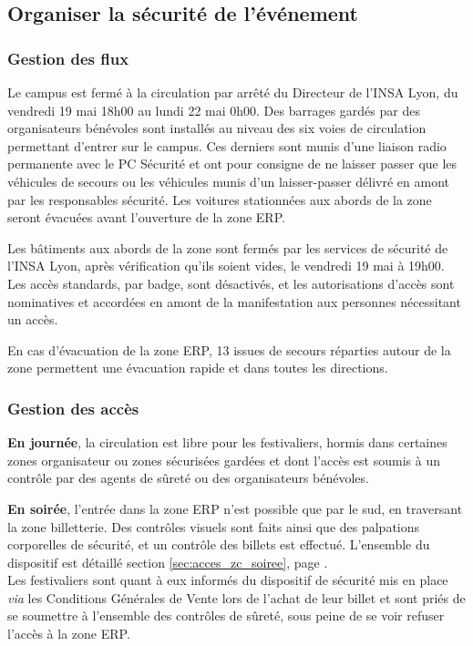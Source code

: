 \documentclass[hidelinks, paper=a4, fontsize=13pt]{report}
\begin{document}
\subsection{Organiser la sécurité de l'événement}

\subsubsection{Gestion des flux}
\label{gestion_flux}

\begin{list}{•}{}
	\item Le campus est fermé à la circulation par arrêté du Directeur de l'INSA Lyon, du vendredi 19 mai 18h00 au lundi 22 mai 0h00. Des barrages gardés par des organisateurs bénévoles sont installés au niveau des six voies de circulation permettant d'entrer sur le campus. Ces derniers sont munis d'une liaison radio permanente avec le PC Sécurité et ont pour consigne de ne laisser passer que les véhicules de secours ou les véhicules munis d'un laisser-passer délivré en amont par les responsables sécurité. Les voitures stationnées aux abords de la zone seront évacuées avant l'ouverture de la zone ERP.
	\item Les bâtiments aux abords de la zone sont fermés par les services de sécurité de l'INSA Lyon, après vérification qu'ils soient vides, le vendredi 19 mai à 19h00. Les accès standards, par badge, sont désactivés, et les autorisations d'accès sont nominatives et accordées en amont de la manifestation aux personnes nécessitant un accès.
	\item En cas d'évacuation de la zone ERP, 13 issues de secours réparties autour de la zone permettent une évacuation rapide et dans toutes les directions.
\end{list}
 
\subsubsection{Gestion des accès} 
\begin{list}{•}{}
	\item \textbf{En journée}, la circulation est libre pour les festivaliers, hormis dans certaines zones organisateur ou zones sécurisées gardées et dont l'accès est soumis à un contrôle par des agents de sûreté ou des organisateurs bénévoles.\\
	\item \textbf{En soirée}, l'entrée dans la zone ERP n'est possible que par le sud, en traversant la zone billetterie. Des contrôles visuels sont faits ainsi que des palpations corporelles de sécurité, et un contrôle des billets est effectué. L'ensemble du dispositif est détaillé section \ref{sec:acces_zc_soiree}, page \pageref{sec:acces_zc_soiree}.\\
Les festivaliers sont quant à eux informés du dispositif de sécurité mis en place \textit{via} les Conditions Générales de Vente lors de l'achat de leur billet et sont priés de se soumettre à l'ensemble des contrôles de sûreté, sous peine de se voir refuser l'accès à la zone ERP. 
\end{list}
\end{document}

